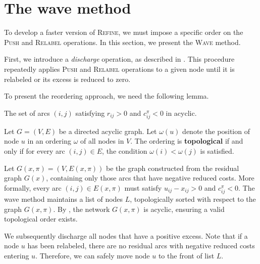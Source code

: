 \section{The wave method}
To develop a faster version of \textsc{Refine}, we must impose a specific order on the \textsc{Push} and \textsc{Relabel} operations. In this section, we present the \textsc{Wave} method.

First, we introduce a \textit{discharge} operation, as described in . This procedure repeatedly applies \textsc{Push} and \textsc{Relabel} operations to a given node until it is relabeled or its excess is reduced to zero.
\begin{algorithm}[H]
\caption{\textsc{Discharge}}
\label{alg:push_relabel_discharge}
    \begin{algorithmic}[1]
            \State {}
            \EndWhile
        \EndProcedure
    \end{algorithmic}
\end{algorithm}

To present the reordering approach, we need the following lemma.
\begin{lemma}\label{lem:admissible_acyclic}
    The set of arcs $(i,j)$ satisfying $r_{ij} > 0$ and $c^{\pi}_{ij} < 0$ in acyclic.
\end{lemma}
\begin{defn}
    Let $G=(V,E)$ be a directed acyclic graph. Let $\omega(u)$ denote the position of node $u$ in an ordering $\omega$ of all nodes in $V$. The ordering is \textbf{topological} if and only if for every arc $(i,j) \in E$, the condition $\omega(i) < \omega(j)$ is satisfied.
\end{defn}

Let $G(x, \pi) = (V, E(x,\pi))$ be the graph constructed from the residual graph $G(x)$, containing only those arcs that have negative reduced costs. More formally, every arc $(i,j) \in E(x,\pi)$ must satisfy $u_{ij} - x_{ij} > 0$ and $c_{ij}^\pi < 0$. The wave method maintains a list of nodes $L$, topologically sorted with respect to the graph $G(x, \pi)$. By , the network $G(x,\pi)$ is acyclic, ensuring a valid topological order exists.

We subsequently discharge all nodes that have a positive excess. Note that if a node $u$ has been relabeled, there are no residual arcs with negative reduced costs entering $u$. Therefore, we can safely move node $u$ to the front of list $L$.

